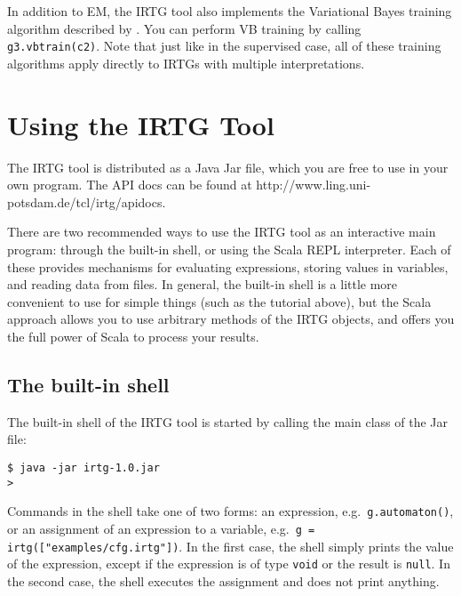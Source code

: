 \documentclass[11pt]{article}
\begin{document}
In addition to EM, the IRTG tool also implements the Variational Bayes
training algorithm described by
\citet{jones12:_seman_parsin_bayes_tree_trans}.  You can perform VB
training by calling \verb?g3.vbtrain(c2)?.  Note that just like in the
supervised case, all of these training algorithms apply directly to
IRTGs with multiple interpretations.



\section{Using the IRTG Tool} \label{sec:using}

The IRTG tool is distributed as a Java Jar file, which you are free to
use in your own program. The API docs can be found at
http://www.ling.uni-potsdam.de/tcl/irtg/apidocs.

There are two recommended ways to use the IRTG tool as an interactive
main program: through the built-in shell, or using the Scala REPL
interpreter.  Each of these provides mechanisms for evaluating
expressions, storing values in variables, and reading data from files.
In general, the built-in shell is a little more convenient to use for
simple things (such as the tutorial above), but the Scala approach
allows you to use arbitrary methods of the IRTG objects, and offers
you the full power of Scala to process your results.

\subsection{The built-in shell}

The built-in shell of the IRTG tool is started by calling the main
class of the Jar file:

\begin{verbatim}
$ java -jar irtg-1.0.jar
> 
\end{verbatim}

Commands in the shell take one of two forms: an expression, e.g.\
\verb?g.automaton()?, or an assignment of an expression to a variable,
e.g.\ \verb?g = irtg(["examples/cfg.irtg"])?.  In the first case, the
shell simply prints the value of the expression, except if the
expression is of type \verb?void? or the result is \verb?null?. In the
second case, the shell executes the assignment and does not print
anything.
\end{document}
